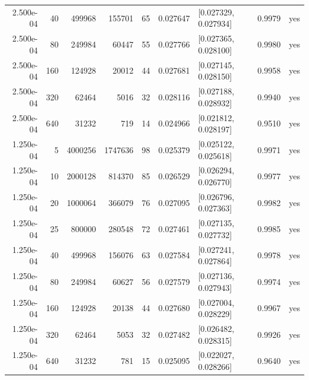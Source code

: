 \documentclass[10pt]{article}
\begin{document}
\begin{longtable}{r r r r r r l r c}
2.500e-04 & 40 & 499968 & 155701 & 65 & 0.027647 & [0.027329, 0.027934] & 0.9979 & yes \\
2.500e-04 & 80 & 249984 & 60447 & 55 & 0.027766 & [0.027365, 0.028100] & 0.9980 & yes \\
2.500e-04 & 160 & 124928 & 20012 & 44 & 0.027681 & [0.027145, 0.028150] & 0.9958 & yes \\
2.500e-04 & 320 & 62464 & 5016 & 32 & 0.028116 & [0.027188, 0.028932] & 0.9940 & yes \\
2.500e-04 & 640 & 31232 & 719 & 14 & 0.024966 & [0.021812, 0.028197] & 0.9510 & yes \\
1.250e-04 & 5 & 4000256 & 1747636 & 98 & 0.025379 & [0.025122, 0.025618] & 0.9971 & yes \\
1.250e-04 & 10 & 2000128 & 814370 & 85 & 0.026529 & [0.026294, 0.026770] & 0.9977 & yes \\
1.250e-04 & 20 & 1000064 & 366079 & 76 & 0.027095 & [0.026796, 0.027363] & 0.9982 & yes \\
1.250e-04 & 25 & 800000 & 280548 & 72 & 0.027461 & [0.027135, 0.027732] & 0.9985 & yes \\
1.250e-04 & 40 & 499968 & 156076 & 63 & 0.027584 & [0.027241, 0.027864] & 0.9978 & yes \\
1.250e-04 & 80 & 249984 & 60627 & 56 & 0.027579 & [0.027136, 0.027943] & 0.9974 & yes \\
1.250e-04 & 160 & 124928 & 20138 & 44 & 0.027680 & [0.027004, 0.028229] & 0.9967 & yes \\
1.250e-04 & 320 & 62464 & 5053 & 32 & 0.027482 & [0.026482, 0.028315] & 0.9926 & yes \\
1.250e-04 & 640 & 31232 & 781 & 15 & 0.025095 & [0.022027, 0.028266] & 0.9640 & yes \\
\bottomrule
\end{longtable}
\normalsize
\end{document}
